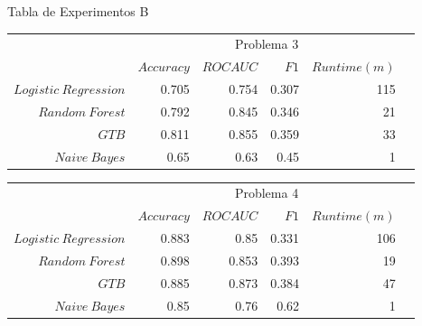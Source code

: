 \documentclass[xcolor=x11names]{beamer}
\newcommand{\ra}[1]{\renewcommand{\arraystretch}{#1}}
\begin{document}
\begin{frame}{Tabla de Experimentos B}

	\begin{table}[htp]\centering
	\footnotesize
		\ra{1.3}
		\begin{tabular}{@{}rr@{\hskip 0.3cm}r@{\hskip 0.3cm}r@{\hskip 0.3cm}rc@{}} \toprule
			&  \multicolumn{4}{c}{Problema 3} \\
			\cmidrule{2-5}
			& $Accuracy$ & $ROC AUC$ & $F1$ & $Runtime  (m)$ \\ \midrule
			$Logistic \ Regression$     & 0.705 & 0.754 & 0.307 & 115 \\
			$Random \ Forest$            &  0.792 & 0.845 & 0.346 & 21 \\
			$GTB$ & 0.811 & 0.855 & 0.359 & 33 \\
			$Naive \ Bayes$               & 0.65  & 0.63  & 0.45  & 1  \\

			\bottomrule
		\end{tabular}
		\ra{1.3}
		\begin{tabular}{@{}rr@{\hskip 0.3cm}r@{\hskip 0.3cm}r@{\hskip 0.3cm}rc@{}} \toprule
			&  \multicolumn{4}{c}{Problema 4} \\
			\cmidrule{2-5}
			& $Accuracy$ & $ROC AUC$ & $F1$ & $Runtime  (m)$ \\ \midrule
			$Logistic \ Regression$     & 0.883 & 0.85  & 0.331 & 106 \\
			$Random \ Forest$            & 0.898 & 0.853 & 0.393 & 19 \\
			$GTB$ & 0.885 & 0.873 & 0.384 & 47 \\
			$Naive \ Bayes$               & 0.85  & 0.76  & 0.62 & 1 \\

			\bottomrule
		\end{tabular}
	\end{table}

\end{frame}
\end{document}

